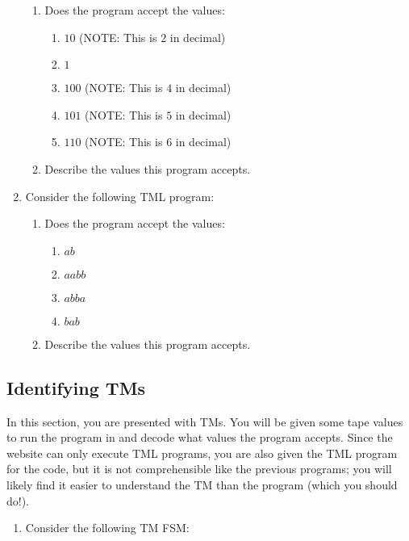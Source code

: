 \begin{appendices}
\begin{enumerate}
    \begin{enumerate}
        \item Does the program accept the values:
        \begin{enumerate}
            \item $10$ (NOTE: This is $2$ in decimal)
            \item $1$
            \item $100$ (NOTE: This is $4$ in decimal)
            \item $101$ (NOTE: This is $5$ in decimal)
            \item $110$ (NOTE: This is $6$ in decimal)
        \end{enumerate}
        \item Describe the values this program accepts.
    \end{enumerate}
    \newpage

    \item Consider the following TML program:
    
    \begin{enumerate}
        \item Does the program accept the values:
        \begin{enumerate}
            \item $ab$
            \item $aabb$
            \item $abba$
            \item $bab$
        \end{enumerate}
        
        \item Describe the values this program accepts.
    \end{enumerate}
\end{enumerate}

\newpage

\subsection{Identifying TMs}
In this section, you are presented with TMs. You will be given some tape values to run the program in and decode what values the program accepts. Since the website can only execute TML programs, you are also given the TML program for the code, but it is not comprehensible like the previous programs; you will likely find it easier to understand the TM than the program (which you should do!). 
\begin{enumerate}
    \item Consider the following TM FSM:
    \begin{figure}[H]
        \centering
\end{figure}
\end{enumerate}
\end{appendices}
